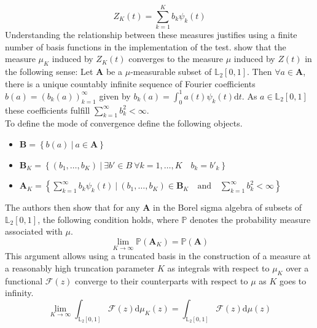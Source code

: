 \documentclass[12pt, a4paper]{article}
\theoremstyle{MAstyle} \newtheorem{assumption}{Assumption}[section]
\theoremstyle{MAstyle} \newtheorem{definition}{Definition}[section]
\theoremstyle{MAstyle} \newtheorem{theorem}{Theorem}[section]
\begin{document}
			\begin{equation}\label{finite_sum}
				Z_K(t) = \sum_{k = 1}^{K} b_k \psi_k(t)
			\end{equation}
			Understanding the relationship between these measures justifies using a finite number of basis functions in the implementation of the test.
			\cite{bugni_goodness--fit_2009} show that the measure $\mu_K$ induced by $Z_K(t)$ converges to the measure $\mu$ induced by $Z(t)$ in the following sense: Let $\textbf{A}$ be a $\mu$-measurable subset of $\mathbb{L}_2[0,1]$. Then $\forall a \in \textbf{A}$, there is a unique countably infinite sequence of Fourier coefficients $b(a) = (b_k(a))_{k = 1}^{\infty}$ given by $b_k(a) = \int_{0}^{1} a(t) \psi_k(t) \mathrm{d}t$. As $a \in \mathbb{L}_2[0,1]$ these coefficients fulfill $\sum_{k = 1}^{\infty} b_k^2 < \infty$. \\
			
			To define the mode of convergence \cite{bugni_goodness--fit_2009} define the following objects.
			\begin{itemize}
				\item $\textbf{B} = \left\{b(a) \ \vert \ a \in \textbf{A}\right\}$
				\item $\textbf{B}_K = \left\{\left(b_1, \dots, b_K \right) \ \vert \ \exists b' \in B \  \forall k = 1, \dots, K \quad b_k = b'_k \right\}$
				\item $\textbf{A}_K = \left\{ \sum_{k = 1}^{\infty} b_k \psi_k(t) \ \vert \ \left(b_1, \dots, b_K \right) \in \textbf{B}_K \quad \text{and} \quad \sum_{k = 1}^{\infty} b_k^2 < \infty \right\}$
			\end{itemize}
			The authors then show that for any $\textbf{A}$ in the Borel sigma algebra of subsets of $\mathbb{L}_2[0,1]$, the following condition holds, where $\mathbb{P}$ denotes the probability measure associated with $\mu$.
			\begin{equation}
				\lim_{K \rightarrow \infty} \mathbb{P}(\textbf{A}_K) = \mathbb{P}(\textbf{A})
			\end{equation}
			This argument allows using a truncated basis in the construction of a measure at a reasonably high truncation parameter $K$ as integrals with respect to $\mu_K$ over a functional $\mathcal{F}(z)$ converge to their counterparts with respect to $\mu$ as $K$ goes to infinity.
			\begin{equation}
				\lim_{K \rightarrow \infty} \int_{\mathbb{L}_2[0,1]} \mathcal{F}(z) \mathrm{d}\mu_K(z) = \int_{\mathbb{L}_2[0,1]} \mathcal{F}(z) \mathrm{d}\mu(z)
			\end{equation}
			
\end{document}
